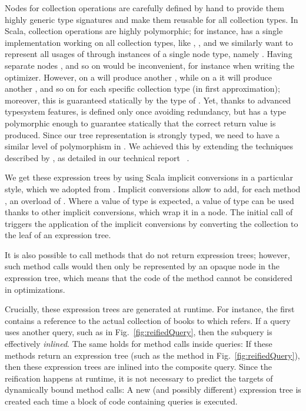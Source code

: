 Nodes for collection operations are carefully defined by hand to provide them
highly generic type signatures and make them reusable for all collection types.
In Scala, collection operations are highly polymorphic; for instance, 
has a single implementation working on all collection types, like ,
, and we similarly want to represent all usages of  through
instances of a single node type, namely . Having separate nodes ,  and so
on would be inconvenient, for instance when writing the optimizer.
However, 
on a  will produce another , while on a  it
will produce another , and so on for each specific collection type (in
first approximation); moreover, this is guaranteed statically by the type of
. Yet, thanks to advanced typesystem features,  is defined
only once avoiding redundancy, but has a type polymorphic enough to guarantee
statically that the correct return value is produced.
Since our tree representation is strongly typed, we need to have a similar level
of polymorphism in . We achieved this by extending the techniques
described by \citet{odersky2009fighting}, as detailed in our technical report%
~\citep{GiarrussoEtAl2012ReifyTR}.

We get these expression trees by using Scala implicit conversions in a particular style, which we adopted from
\citet{rompf2010lightweight}. Implicit conversions allow to add, for each method
, an overload of . Where a value of
type  is expected, a value of type  can be used thanks to
other implicit conversions, which wrap it in a  node. The initial call of  triggers the application of the implicit conversions by
converting the collection to the leaf of an expression tree.

It is also possible to call methods that do not return expression trees; however, such method calls would
then only be represented by an opaque  node in the expression tree, which means that the code
of the method cannot be considered in optimizations. 

Crucially, these expression trees are generated at runtime. For instance,
the first  contains a reference to the actual collection of books to which  refers.
If a query uses another query, such as  in Fig.~\ref{fig:reifiedQuery}, then
the subquery is effectively \emph{inlined}. The same holds for method calls inside queries: If these methods
return an expression tree (such as the  method in Fig.~\ref{fig:reifiedQuery}), then
these expression trees are inlined into the composite query. Since the reification happens at runtime, it is not
necessary to predict the targets of dynamically bound method calls: A new (and possibly different) expression tree
is created each time a block of code containing queries is executed.

